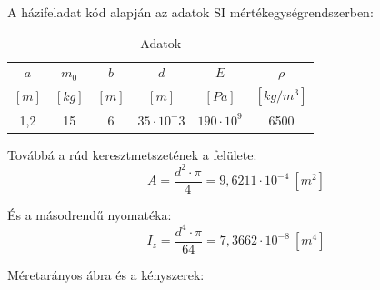 \documentclass{article}
\begin{document}
	A házifeladat kód alapján az adatok SI mértékegységrendszerben:
	\def\arraystretch{1.2}%
	\begin{table}[h!]
		\begin{center}
			\caption{Adatok}
			\label{tab:table1}
			\begin{tabular}{c|c|c|c|c|c} %
				$a$ & $m_{0}$ & $b$ & $d$ & $E$ & $\rho$\\
				$[m]$ & $[kg]$ & $[m]$ & $[m]$ & $[Pa]$ & $[kg/m^{3}]$\\
				\hline
				1,2 & 15 & 6 & $35\cdot10^-3$ & $190\cdot10^9$ & 6500\\
			\end{tabular}
		\end{center}
	\end{table}
	\def\arraystretch{1}%
	
	Továbbá a rúd keresztmetszetének a felülete:
	\begin{equation}
	A=\frac{d^{2}\cdot\pi}{4}=9,6211 \cdot 10^{-4}~[m^{2}]
	\end{equation}
	
	És a másodrendű nyomatéka:
	\begin{equation}
	I_{z}=\frac{d^4\cdot\pi}{64}=7,3662 \cdot 10^{-8}~[m^{4}]
	\end{equation}
	
	Méretarányos ábra és a kényszerek:
	
	\newcommand{\sugar}{2}
	\newcommand{\ab}{600}
	\newcommand{\bc}{120}
	\newcommand{\acv}{701}
	\newcommand{\ac}{720}
	\newcommand{\acvv}{735}
	
\end{document}
